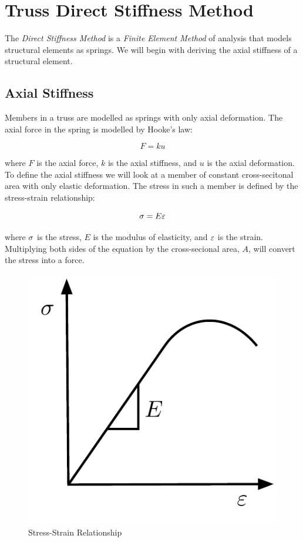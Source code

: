 \section{Truss Direct Stiffness Method}



The \textit{Direct Stiffness Method} is a \textit{Finite Element Method} of analysis that models structural elements as springs. We will begin with deriving the axial stiffness of a structural element. \cite{Felippa2000}

\subsection{Axial Stiffness}
Members in a truss are modelled as springs with only axial deformation. The axial force in the spring is modelled by Hooke's law:

\begin{equation}
	F = k u
\end{equation}

where $F$ is the axial force, $k$ is the axial stiffness, and $u$ is the axial deformation. To define the axial stiffness we will look at a member of constant cross-secitonal area with only elastic deformation. The stress in such a member is defined by the stress-strain relationship:

\begin{equation}
	\sigma = E \varepsilon
\end{equation}

where $\sigma$ is the stress, $E$ is the modulus of elasticity, and $\varepsilon$ is the strain. Multiplying both sides of the equation by the cross-secional area, $A$, will convert the stress into a force.

\begin{figure}[h]	\centerline{\includegraphics[width=0.5\columnwidth]{Figures/Stress-Strain}}
	\caption{Stress-Strain Relationship}
	\label{fig:Stress-Strain}
\end{figure}

